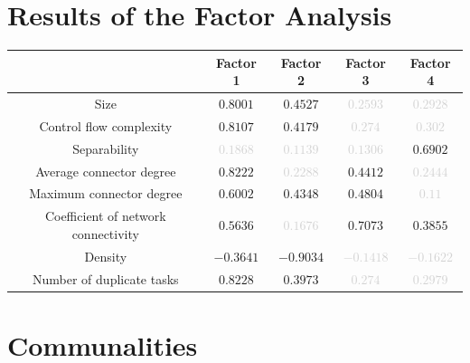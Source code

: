 \documentclass[a4paper]{article}
\begin{document}
\section*{Results of the Factor Analysis}
\begin{center}
\begin{tabular}{ccccc} \toprule 
 & Factor 1 & Factor 2 & Factor 3 & Factor 4 \\ \midrule 
Size & $0.8001$ & $0.4527$ & \textcolor{lightgray}{$0.2593$} & \textcolor{lightgray}{$0.2928$} \\ 
Control flow complexity & $0.8107$ & $0.4179$ & \textcolor{lightgray}{$0.274$} & \textcolor{lightgray}{$0.302$} \\ 
Separability & \textcolor{lightgray}{$0.1868$} & \textcolor{lightgray}{$0.1139$} & \textcolor{lightgray}{$0.1306$} & $0.6902$ \\ 
Average connector degree & $0.8222$ & \textcolor{lightgray}{$0.2288$} & $0.4412$ & \textcolor{lightgray}{$0.2444$} \\ 
Maximum connector degree & $0.6002$ & $0.4348$ & $0.4804$ & \textcolor{lightgray}{$0.11$} \\ 
Coefficient of network connectivity & $0.5636$ & \textcolor{lightgray}{$0.1676$} & $0.7073$ & $0.3855$ \\ 
Density & $-0.3641$ & $-0.9034$ & \textcolor{lightgray}{$-0.1418$} & \textcolor{lightgray}{$-0.1622$} \\ 
Number of duplicate tasks & $0.8228$ & $0.3973$ & \textcolor{lightgray}{$0.274$} & \textcolor{lightgray}{$0.2979$} \\ 
\bottomrule
\end{tabular}
\end{center}

\section*{Communalities}
\begin{center}
\end{center}
\end{document}
